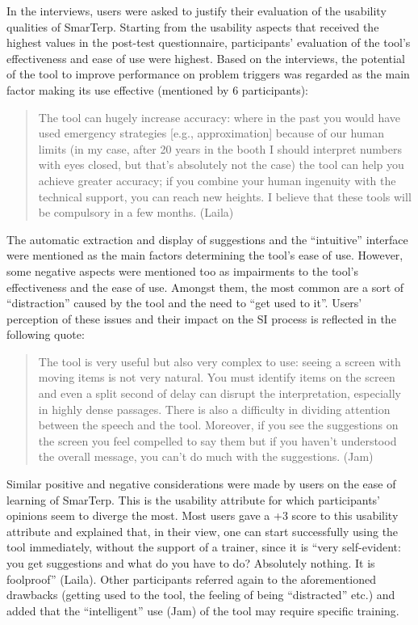 In the interviews, users were asked to justify their evaluation of the usability qualities of SmarTerp. Starting from the usability aspects that received the highest values in the post-test questionnaire, participants’ evaluation of the tool’s effectiveness and ease of use were highest. Based on the interviews, the potential of the tool to improve performance on problem triggers was regarded as the main factor making its use effective (mentioned by 6 participants):
\begin{quote}
    The tool can hugely increase accuracy: where in the past you would have used emergency strategies [e.g., approximation] because of our human limits (in my case, after 20 years in the booth I should interpret numbers with eyes closed, but that’s absolutely not the case) the tool can help you achieve greater accuracy; if you combine your human ingenuity with the technical support, you can reach new heights. I believe that these tools will be compulsory in a few months. (Laila)
\end{quote}
The automatic extraction and display of suggestions and the ``intuitive'' interface were mentioned as the main factors determining the tool’s ease of use. However, some negative aspects were mentioned too as impairments to the tool’s effectiveness and the ease of use. Amongst them, the most common are a sort of ``distraction'' caused by the tool and the need to ``get used to it''. Users’ perception of these issues and their impact on the SI process is reflected in the following quote:
\begin{quote}
    The tool is very useful but also very complex to use: seeing a screen with moving items is not very natural. You must identify items on the screen and even a split second of delay can disrupt the interpretation, especially in highly dense passages. There is also a difficulty in dividing attention between the speech and the tool. Moreover, if you see the suggestions on the screen you feel compelled to say them but if you haven’t understood the overall message, you can’t do much with the suggestions. (Jam)
\end{quote}
Similar positive and negative considerations were made by users on the ease of learning of SmarTerp. This is the usability attribute for which participants’ opinions seem to diverge the most. Most users gave a +3 score to this usability attribute and explained that, in their view, one can start successfully using the tool immediately, without the support of a trainer, since it is ``very self-evident: you get suggestions and what do you have to do? Absolutely nothing. It is foolproof'' (Laila). Other participants referred again to the aforementioned drawbacks (getting used to the tool, the feeling of being ``distracted'' etc.) and added that the ``intelligent'' use (Jam) of the tool may require specific training.

